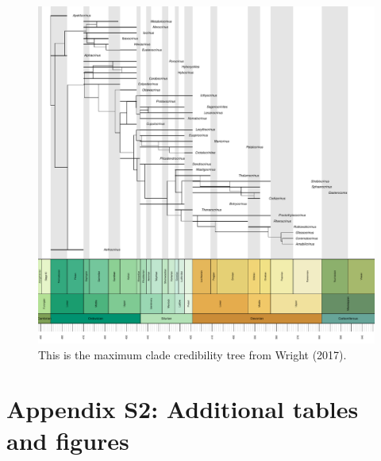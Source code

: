 \documentclass[12pt,a4paper]{article}
\begin{document}
\begin{figure}[!htbp]
    \centering
    \includegraphics[width=1\linewidth, height=1\textheight, keepaspectratio]{figures/fig-tree-Wright2017-appendix.pdf}
    \caption[Wright2017.]
    {This is the maximum clade credibility tree from Wright (2017).}
    \label{figure:wright}
  \end{figure}  

\newpage
\section{Appendix S2: Additional tables and figures}
\end{document}
